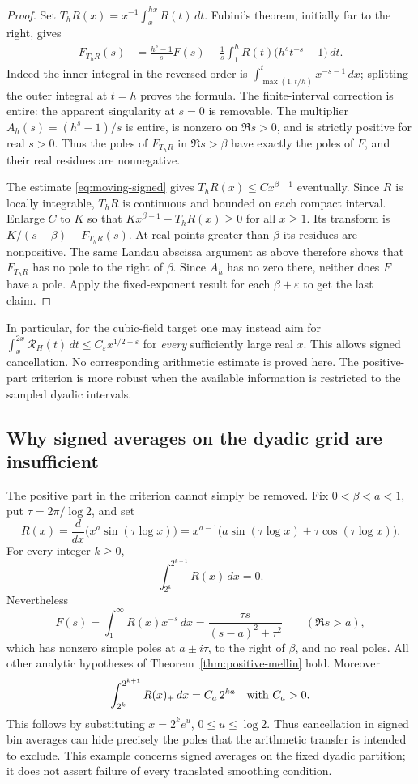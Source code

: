 \begin{proof}
Set $T_hR(x)=x^{-1}\int_x^{hx}R(t)\,dt$. Fubini's theorem, initially
far to the right, gives
\begin{align*}
 F_{T_hR}(s)
 &=\frac{h^s-1}{s}F(s)
 -\frac1s\int_1^h R(t)\bigl(h^s t^{-s}-1\bigr)\,dt.
\end{align*}
Indeed the inner integral in the reversed order is
$\int_{\max(1,t/h)}^t x^{-s-1}\,dx$; splitting the outer integral
at $t=h$ proves the formula. The finite-interval correction is entire:
the apparent singularity at $s=0$ is removable. The multiplier
$A_h(s)=(h^s-1)/s$ is entire, is nonzero on $\Re s>0$, and is
strictly positive for real $s>0$. Thus the poles of $F_{T_hR}$ in
$\Re s>\beta$ have exactly the poles of $F$, and their real residues
are nonnegative.

The estimate \eqref{eq:moving-signed} gives
$T_hR(x)\le Cx^{\beta-1}$ eventually. Since $R$ is locally integrable,
$T_hR$ is continuous and bounded on each compact interval. Enlarge $C$ to
$K$ so that $Kx^{\beta-1}-T_hR(x)\ge0$ for all $x\ge1$.
Its transform is
$K/(s-\beta)-F_{T_hR}(s)$. At real points greater than $\beta$
its residues are nonpositive. The same Landau abscissa argument as above
therefore shows that $F_{T_hR}$ has no pole to the right of $\beta$.
Since $A_h$ has no zero there, neither does $F$ have a pole. Apply the
fixed-exponent result for each $\beta+\varepsilon$ to get the last claim.
\end{proof}

In particular, for the cubic-field target one may instead aim for
$\int_x^{2x}\mathcal R_H(t)\,dt\le C_\varepsilon
x^{1/2+\varepsilon}$ for \emph{every} sufficiently large real $x$.
This allows signed cancellation.  No corresponding arithmetic estimate is
proved here. The positive-part criterion is more robust when the available
information is restricted to the sampled dyadic intervals.

\subsection{Why signed averages on the dyadic grid are insufficient}

The positive part in the criterion cannot simply be removed. Fix
$0<\beta<a<1$, put $\tau=2\pi/\log2$, and set
\[
 R(x)=\frac{d}{dx}\bigl(x^a\sin(\tau\log x)\bigr)
 =x^{a-1}\bigl(a\sin(\tau\log x)+\tau\cos(\tau\log x)\bigr).
\]
For every integer $k\ge0$,
\[
 \int_{2^k}^{2^{k+1}}R(x)\,dx=0.
\]
Nevertheless
\[
 F(s)=\int_1^\infty R(x)x^{-s}\,dx
 =\frac{\tau s}{(s-a)^2+\tau^2}
 \qquad(\Re s>a),
\]
which has nonzero simple poles at $a\pm i\tau$, to the right of
$\beta$, and no real poles. All other analytic hypotheses of
Theorem~\ref{thm:positive-mellin} hold. Moreover
\[
 \int_{2^k}^{2^{k+1}}R(x)_+\,dx=C_a\,2^{ka}
 \quad\hbox{with }C_a>0.
\]
This follows by substituting $x=2^k e^u$, $0\le u\le\log2$.
Thus cancellation in signed bin averages can hide precisely the poles
that the arithmetic transfer is intended to exclude. This example concerns
signed averages on the fixed dyadic partition; it does not assert failure of
every translated smoothing condition.
